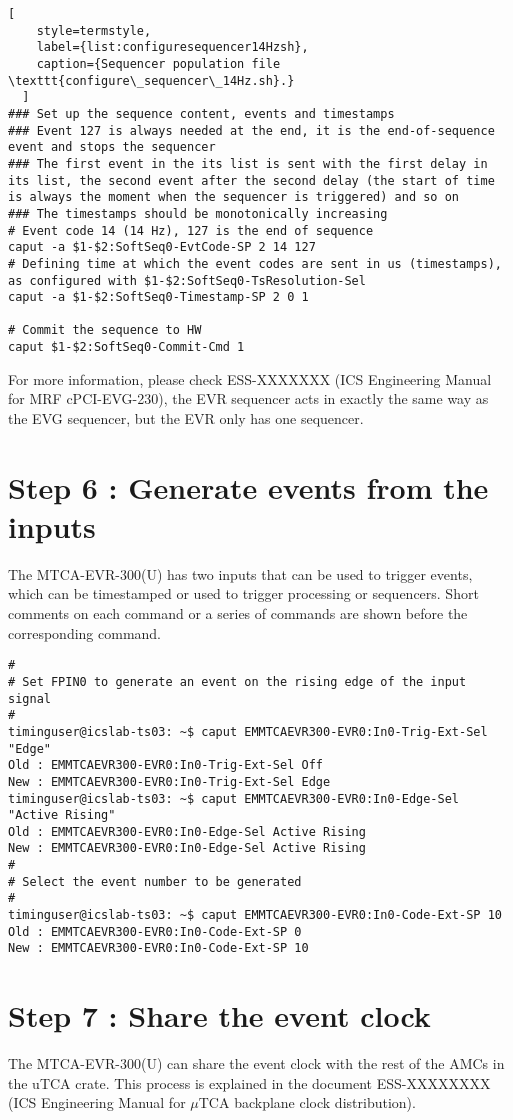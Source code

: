 \documentclass[11pt
  , a4paper
  , article
  , oneside
  , showtrims
]{memoir}
\begin{document}
{\begin{lstlisting}[
    style=termstyle,
    label={list:configuresequencer14Hzsh},
    caption={Sequencer population file \texttt{configure\_sequencer\_14Hz.sh}.}
  ]
### Set up the sequence content, events and timestamps
### Event 127 is always needed at the end, it is the end-of-sequence event and stops the sequencer
### The first event in the its list is sent with the first delay in its list, the second event after the second delay (the start of time is always the moment when the sequencer is triggered) and so on
### The timestamps should be monotonically increasing
# Event code 14 (14 Hz), 127 is the end of sequence
caput -a $1-$2:SoftSeq0-EvtCode-SP 2 14 127
# Defining time at which the event codes are sent in us (timestamps), as configured with $1-$2:SoftSeq0-TsResolution-Sel
caput -a $1-$2:SoftSeq0-Timestamp-SP 2 0 1

# Commit the sequence to HW
caput $1-$2:SoftSeq0-Commit-Cmd 1
\end{lstlisting}
For more information, please check ESS-XXXXXXX (ICS Engineering Manual for MRF cPCI-EVG-230), the EVR sequencer acts in exactly the same way as the EVG sequencer, but the EVR only has one sequencer.


\section{Step 6 : Generate events from the inputs}
The MTCA-EVR-300(U) has two inputs that can be used to trigger events, which can be timestamped or used to trigger processing or sequencers. Short comments on each command or a series of commands are shown before the corresponding command.
\begin{lstlisting}[style=termstyle]
#
# Set FPIN0 to generate an event on the rising edge of the input signal
#
timinguser@icslab-ts03: ~$ caput EMMTCAEVR300-EVR0:In0-Trig-Ext-Sel "Edge"
Old : EMMTCAEVR300-EVR0:In0-Trig-Ext-Sel Off
New : EMMTCAEVR300-EVR0:In0-Trig-Ext-Sel Edge
timinguser@icslab-ts03: ~$ caput EMMTCAEVR300-EVR0:In0-Edge-Sel "Active Rising"
Old : EMMTCAEVR300-EVR0:In0-Edge-Sel Active Rising
New : EMMTCAEVR300-EVR0:In0-Edge-Sel Active Rising
#
# Select the event number to be generated
#
timinguser@icslab-ts03: ~$ caput EMMTCAEVR300-EVR0:In0-Code-Ext-SP 10
Old : EMMTCAEVR300-EVR0:In0-Code-Ext-SP 0
New : EMMTCAEVR300-EVR0:In0-Code-Ext-SP 10
\end{lstlisting}


\section{Step 7 : Share the event clock}
The MTCA-EVR-300(U) can share the event clock with the rest of the AMCs in the uTCA crate. This process is explained in the document ESS-XXXXXXXX (ICS Engineering Manual for $\mu$TCA backplane clock distribution).



}
\end{document}
